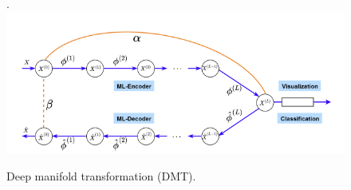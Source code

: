 \begin{figure}[H]
    \centering
    \caption{Deep manifold transformation (DMT).}. 
    \label{fig:li2020DTM}
 \includegraphics[width=150mm]{images/fig7.png}
\end{figure}





